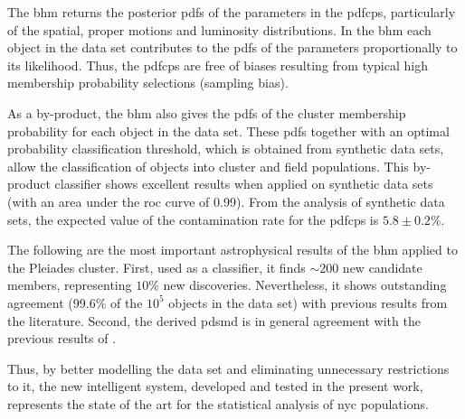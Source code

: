 The \gls{bhm} returns the posterior \glspl{pdf} of the parameters in the \glspl{pdfcp}, particularly of the spatial, proper motions and luminosity distributions. In the \gls{bhm} each object in the data set contributes to the \glspl{pdf} of the parameters proportionally to its likelihood. Thus, the \glspl{pdfcp} are free of biases resulting from typical high membership probability selections (sampling bias).

As a by-product, the \gls{bhm} also gives the \glspl{pdf} of the cluster membership probability for each object in the data set. These \glspl{pdf} together with an optimal probability classification threshold, which is obtained from synthetic data sets, allow the classification of objects into cluster and field populations. This by-product classifier shows excellent results when applied on synthetic data sets (with an area under the \gls{roc} curve of 0.99). From the analysis of synthetic data sets, the expected value of the contamination rate for the \glspl{pdfcp} is $5.8\pm 0.2$\%. 

The following are the most important astrophysical results of the \gls{bhm} applied to the Pleiades cluster. First, used as a classifier, it finds $\sim 200$ new candidate members, representing $10\%$ new discoveries. Nevertheless, it shows outstanding agreement (99.6\% of the $10^5$ objects in the data set) with previous results from the literature. Second, the derived \gls{pdsmd} is in general agreement with the previous results of \citet{Bouy2015}. 

Thus, by better modelling the data set and eliminating unnecessary restrictions to it, the new intelligent system, developed and tested in the present work, represents the state of the art for the statistical analysis of \gls{nyc} populations.



 






